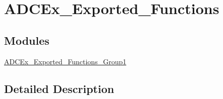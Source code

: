 \hypertarget{group___a_d_c_ex___exported___functions}{}\section{A\+D\+C\+Ex\+\_\+\+Exported\+\_\+\+Functions}
\label{group___a_d_c_ex___exported___functions}
\subsection*{Modules}
\begin{DoxyCompactItemize}
\item 
\mbox{\hyperlink{group___a_d_c_ex___exported___functions___group1}{A\+D\+C\+Ex\+\_\+\+Exported\+\_\+\+Functions\+\_\+\+Group1}}
\end{DoxyCompactItemize}


\subsection{Detailed Description}

